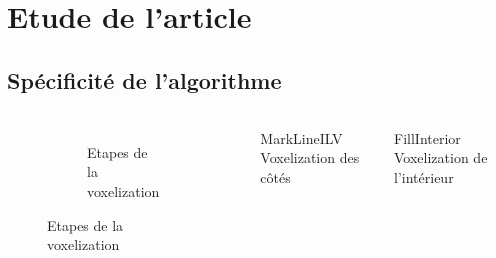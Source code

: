 \section{Etude de l'article}

\subsection{Spécificité de l'algorithme}

\begin{frame}[fragile=singleslide]{\insertsectionhead}

  \framesubtitle{\insertsubsectionhead}
  \begin{columns}[T,onlytextwidth]
    \begin{figure}
      \begin{subfigure}{5.5\textwidth}
        \caption*{Etapes de la voxelization}
      \end{subfigure}
    \end{figure}
    \begin{block}{MarkLineILV}
        Voxelization des côtés
    \end{block}
    \begin{block}{FillInterior}
        Voxelization de l'intérieur
    \end{block}
  \end{columns}
\end{frame}

